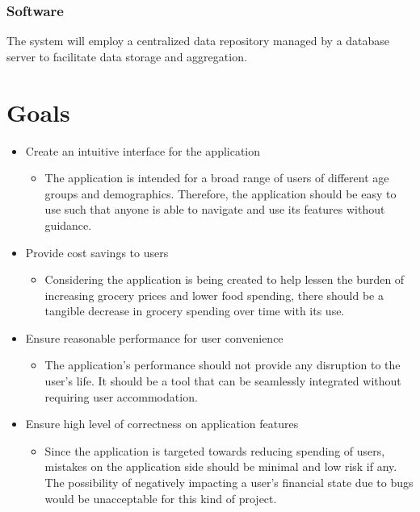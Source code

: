 \documentclass{article}
\begin{document}
\subsubsection{Software}
The system will employ a centralized data repository managed by a database server to facilitate data storage and aggregation.

\section{Goals}

\begin{itemize}
  \item Create an intuitive interface for the application
  \begin{itemize}
    \item The application is intended for a broad range of users of different age groups
    and demographics. Therefore, the application should be easy to use such that anyone
    is able to navigate and use its features without guidance.
  \end{itemize}  
  \item Provide cost savings to users
  \begin{itemize}
    \item Considering the application is being created to help lessen the burden of increasing
    grocery prices and lower food spending, there should be a tangible decrease in grocery spending
    over time with its use.
  \end{itemize}
  \item Ensure reasonable performance for user convenience
  \begin{itemize}
    \item The application's performance should not provide any disruption to the user's life.
    It should be a tool that  can be seamlessly integrated without requiring user
    accommodation.
  \end{itemize} 
  \item Ensure high level of correctness on application features
  \begin{itemize}
    \item Since the application is targeted towards reducing spending of users, mistakes
    on the application side should be minimal and low risk if any. The possibility of negatively
    impacting a user's financial state due to bugs would be unacceptable for this kind of
    project.
  \end{itemize}  
\end{itemize}
\end{document}
